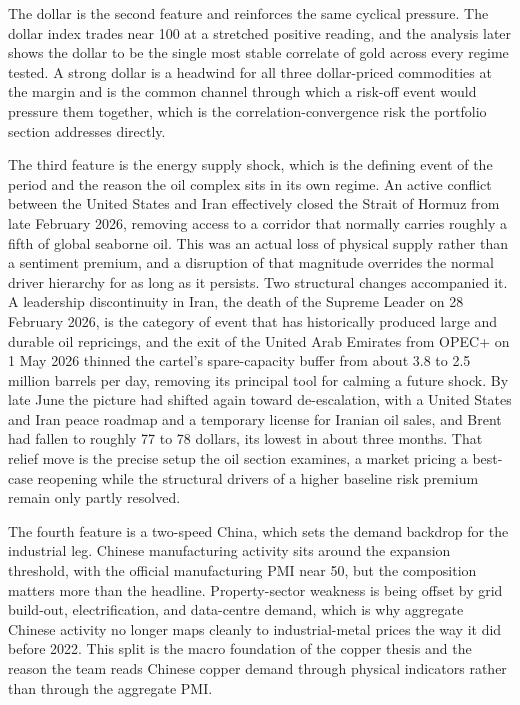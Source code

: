 \documentclass[11pt,a4paper]{article}
\begin{document}
The dollar is the second feature and reinforces the same cyclical pressure. The dollar index trades near 100 at a stretched positive reading, and the analysis later shows the dollar to be the single most stable correlate of gold across every regime tested. A strong dollar is a headwind for all three dollar-priced commodities at the margin and is the common channel through which a risk-off event would pressure them together, which is the correlation-convergence risk the portfolio section addresses directly.

The third feature is the energy supply shock, which is the defining event of the period and the reason the oil complex sits in its own regime. An active conflict between the United States and Iran effectively closed the Strait of Hormuz from late February 2026, removing access to a corridor that normally carries roughly a fifth of global seaborne oil. This was an actual loss of physical supply rather than a sentiment premium, and a disruption of that magnitude overrides the normal driver hierarchy for as long as it persists. Two structural changes accompanied it. A leadership discontinuity in Iran, the death of the Supreme Leader on 28 February 2026, is the category of event that has historically produced large and durable oil repricings, and the exit of the United Arab Emirates from OPEC+ on 1 May 2026 thinned the cartel's spare-capacity buffer from about 3.8 to 2.5 million barrels per day, removing its principal tool for calming a future shock. By late June the picture had shifted again toward de-escalation, with a United States and Iran peace roadmap and a temporary license for Iranian oil sales, and Brent had fallen to roughly 77 to 78 dollars, its lowest in about three months. That relief move is the precise setup the oil section examines, a market pricing a best-case reopening while the structural drivers of a higher baseline risk premium remain only partly resolved.

The fourth feature is a two-speed China, which sets the demand backdrop for the industrial leg. Chinese manufacturing activity sits around the expansion threshold, with the official manufacturing PMI near 50, but the composition matters more than the headline. Property-sector weakness is being offset by grid build-out, electrification, and data-centre demand, which is why aggregate Chinese activity no longer maps cleanly to industrial-metal prices the way it did before 2022. This split is the macro foundation of the copper thesis and the reason the team reads Chinese copper demand through physical indicators rather than through the aggregate PMI.
\end{document}
